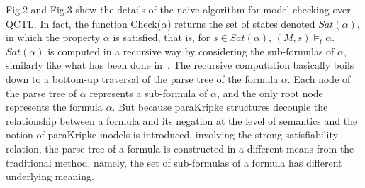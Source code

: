 \documentclass{entcs}
\begin{document}
Fig.2 and Fig.3 show the details of the naive algorithm for model
checking over QCTL. In fact, the function Check($\alpha$) returns
the set of states denoted $Sat(\alpha)$, in which the property
$\alpha$ is satisfied, that is, for $s\in Sat(\alpha)$,
$(M,s)\models_t\alpha$. $Sat(\alpha)$ is computed in a recursive
way by considering the sub-formulas of $\alpha$, similarly like
what has been done in~\cite{TL}. The recursive computation
basically boils down to a bottom-up traversal of the parse tree of
the formula $\alpha$. Each node of the parse tree of $\alpha$
represents a sub-formula of $\alpha$, and the only root node
represents the formula $\alpha$. But because paraKripke structures
decouple the relationship between a formula and its negation at
the level of semantics and the notion of paraKripke models is
introduced, involving the strong satisfiability relation, the
parse tree of a formula is constructed in a different means from
the traditional method, namely, the set of sub-formulas of a
formula has different underlying meaning.
\end{document}
